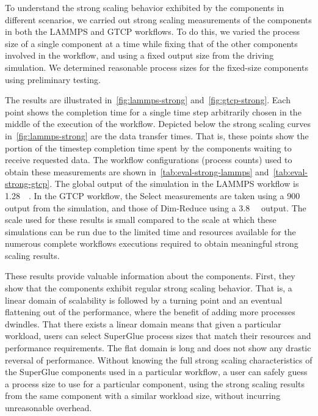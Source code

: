 
To understand the strong scaling behavior exhibited by the components in
different scenarios, we carried out strong scaling measurements of the
components in both the LAMMPS and GTCP workflows.
To do this, we varied the process size of a single component at
a time while fixing that of the other components involved in the workflow,
and using a fixed output size from the driving simulation.  We
determined reasonable process sizes for the fixed-size components using
preliminary testing. 

The results are illustrated in~\autoref{fig:lammps-strong} and~\autoref{fig:gtcp-strong}.
Each point shows
the completion time for a single time step arbitrarily chosen in the middle of
the execution of the workflow. Depicted below the strong scaling curves
in~\autoref{fig:lammps-strong}
are the data transfer times. That is, these points
show the portion of the timestep
completion time spent by the components waiting to receive requested data.
The workflow configurations (process counts) used to obtain these measurements are shown
in~\autoref{tab:eval-strong-lammps} and~\autoref{tab:eval-strong-gtcp}.
The global output of the simulation in the LAMMPS workflow
is \SI{1.28}{\giga\byte}. In the GTCP workflow, the Select
measurements are taken using a \SI{900}{\mega\byte} output
from the simulation, and those of Dim-Reduce using a
\SI{3.8}{\giga\byte} output.
The scale used for these results is small compared to the
scale at which these simulations can be run due to
the limited time and resources available 
for the numerous complete workflows executions required
to obtain meaningful strong scaling results.

These results provide valuable information about the components.
First, they show that the components exhibit regular strong
scaling behavior. That is, 
a linear domain of scalability is followed by a turning point and an
eventual flattening out of the performance, where the benefit
of adding more processes dwindles.
That there exists a linear domain means that given
a particular workload, users can select SuperGlue process sizes
that match their resources and performance requirements.
The flat domain is long and does not show any drastic reversal
of performance. Without knowing the full strong
scaling characteristics of the SuperGlue components used in a particular workflow,
a user can safely guess a process size to use for a particular component,
using the strong scaling results from the same component with a similar
workload size, without incurring unreasonable overhead.

